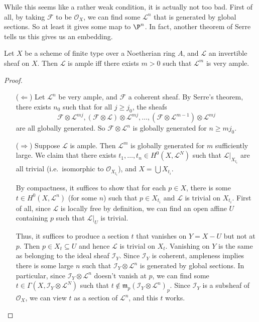 \documentclass[a4paper]{article}
\begin{document}
While this seems like a rather weak condition, it is actually not too bad. First of all, by taking $\mathcal{F}$ to be $\mathcal{O}_X$, we can find some $\mathcal{L}^n$ that is generated by global sections. So at least it gives some map to $\P^n$. In fact, another theorem of Serre tells us this gives us an embedding.

\begin{thm}[Serre]
  Let $X$ be a scheme of finite type over a Noetherian ring $A$, and $\mathcal{L}$ an invertible sheaf on $X$. Then $\mathcal{L}$ is ample iff there exists $m > 0$ such that $\mathcal{L}^m$ is very ample.
\end{thm}

\begin{proof}\leavevmode
  \begin{itemize}
    \item[($\Leftarrow$)] Let $\mathcal{L}^n$ be very ample, and $\mathcal{F}$ a coherent sheaf. By Serre's theorem, there exists $n_0$ such that for all $j \geq j_0$, the sheafs
      \[
        \mathcal{F} \otimes \mathcal{L}^{mj}, (\mathcal{F} \otimes \mathcal{L}) \otimes \mathcal{L}^{mj}, \ldots, (\mathcal{F} \otimes \mathcal{L}^{m - 1}) \otimes \mathcal{L}^{mj}
      \]
      are all globally generated. So $\mathcal{F} \otimes \mathcal{L}^n$ is globally generated for $n \geq mj_0$.
    \item[($\Rightarrow$)] Suppose $\mathcal{L}$ is ample. Then $\mathcal{L}^m$ is globally generated for $m$ sufficiently large. We claim that there exists $t_1, \ldots, t_n \in H^0(X, \mathcal{L}^N)$ such that $\mathcal{L}|_{X_{t_i}}$ are all trivial (i.e.\ isomorphic to $\mathcal{O}_{X_{t_i}}$), and $X = \bigcup X_{t_i}$.

      By compactness, it suffices to show that for each $p \in X$, there is some $t \in H^0(X, \mathcal{L}^n)$ (for some $n$) such that $p \in X_{t_i}$ and $\mathcal{L}$ is trivial on $X_{t_i}$. First of all, since $\mathcal{L}$ is locally free by definition, we can find an open affine $U$ containing $p$ such that $\mathcal{L}|_U$ is trivial.

      Thus, it suffices to produce a section $t$ that vanishes on $Y = X - U$ but not at $p$. Then $p \in X_t \subseteq U$ and hence $\mathcal{L}$ is trivial on $X_t$. Vanishing on $Y$ is the same as belonging to the ideal sheaf $\mathcal{I}_Y$. Since $\mathcal{I}_Y$ is coherent, ampleness implies there is some large $n$ such that $\mathcal{I}_Y \otimes \mathcal{L}^n$ is generated by global sections. In particular, since $\mathcal{I}_Y \otimes \mathcal{L}^n$ doesn't vanish at $p$, we can find some $t \in \Gamma(X, \mathcal{I}_Y \otimes \mathcal{L}^N)$ such that $t \not \in \mathfrak{m}_p (\mathcal{I}_Y \otimes \mathcal{L}^n)_p$. Since $\mathcal{I}_Y$ is a subsheaf of $\mathcal{O}_X$, we can view $t$ as a section of $\mathcal{L}^n$, and this $t$ works.


\end{itemize}
\end{proof}
\end{document}
